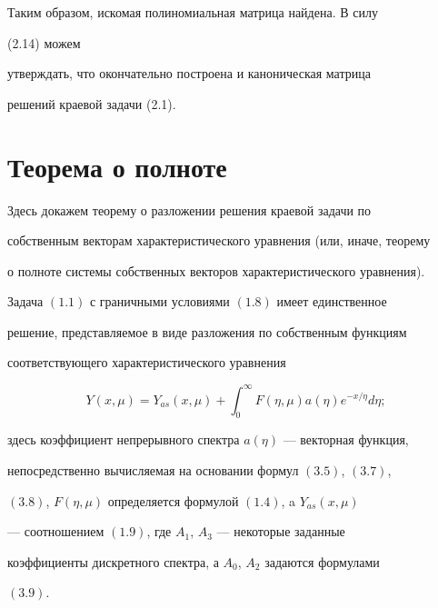  


Таким образом, искомая полиномиальная матрица найдена. В силу 


(2.14) можем 


утверждать, что окончательно построена и каноническая матрица 


решений краевой задачи (2.1). 


 


 


\section{Теорема о полноте} 


 


Здесь докажем теорему о разложении решения краевой задачи по 


собственным векторам характеристического уравнения (или, иначе, теорему 


о полноте системы собственных векторов характеристического уравнения). 


 


\begin{thmnonum} 


Задача $(1.1)$ с граничными условиями $(1.8)$ имеет единственное 


решение, представляемое в виде разложения по собственным функциям 


соответствующего характеристического уравнения 


\begin{equation} 


Y(x,\mu)=Y_{as}(x,\mu)+\int^\infty_0 


F(\eta,\mu)a(\eta)e^{-x/\eta}d\eta; 


\end{equation} 


здесь коэффициент непрерывного спектра $a(\eta)$ --- векторная функция, 


непосредственно вычисляемая на основании формул $(3.5)$, $(3.7)$, 


$(3.8)$, $F(\eta,\mu)$ определяется формулой $(1.4)$, a $Y_{as}(x,\mu)$ 


--- соотношением $(1.9)$, где $A_1$, $A_3$ --- некоторые заданные 


коэффициенты дискретного спектра, а $A_0$, $A_2$ задаются формулами 


$(3.9)$. 


\end{thmnonum} 


